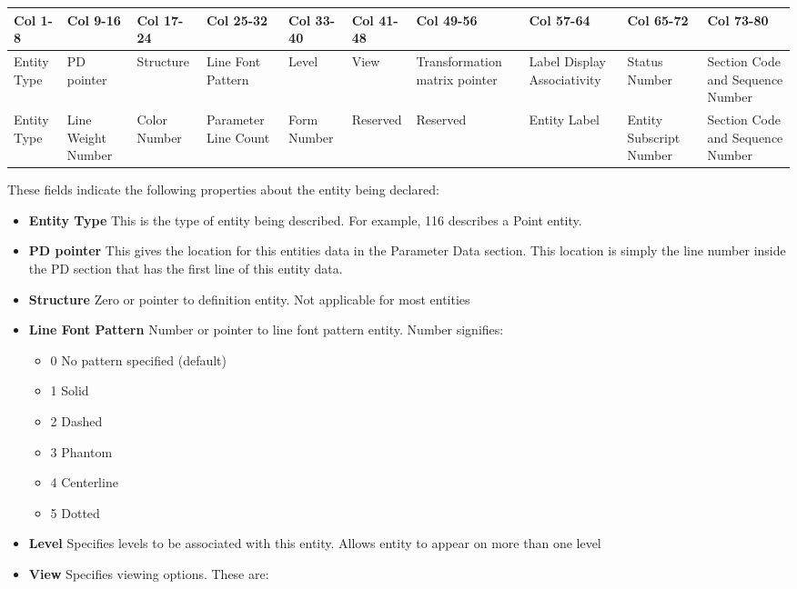 \begin{table}[H]
  \tiny
  \centering
    \begin{tabular}{|*{10}{p{1cm}|}}
      \hline
      Col  1-8 & Col  9-16 & Col 17-24 & Col 25-32 & Col 33-40 & Col 41-48 & Col
      49-56 & Col 57-64 & Col 65-72 & Col 73-80 \\ \hline
      Entity Type & PD pointer & Structure & Line Font Pattern & Level & View
      & Transformation matrix pointer & Label Display Associativity & Status
      Number & Section Code and Sequence Number \\ \hline
      Entity Type & Line Weight Number & Color Number & Parameter Line Count &
      Form Number & Reserved & Reserved & Entity Label & Entity Subscript
      Number & Section Code and Sequence Number \\ \hline
    \end{tabular}
\end{table}

These fields indicate the following properties about the entity being
declared:

\begin{itemize}
\itemsep1pt\parskip0pt
\item
  \textbf{Entity Type} This is the type of entity being described. For
  example, 116 describes a Point entity.
\item
  \textbf{PD pointer} This gives the location for this entities data in
  the Parameter Data section. This location is simply the line number
  inside the PD section that has the first line of this entity data.
\item
  \textbf{Structure} Zero or pointer to definition entity. Not
  applicable for most entities
\item
  \textbf{Line Font Pattern} Number or pointer to line font pattern
  entity. Number signifies:

  \begin{itemize}
  \itemsep1pt\parskip0pt
  \item
    0 No pattern specified (default)
  \item
    1 Solid
  \item
    2 Dashed
  \item
    3 Phantom
  \item
    4 Centerline
  \item
    5 Dotted
  \end{itemize}
\item
  \textbf{Level} Specifies levels to be associated with this entity.
  Allows entity to appear on more than one level
\item
  \textbf{View} Specifies viewing options. These are:
\end{itemize}


